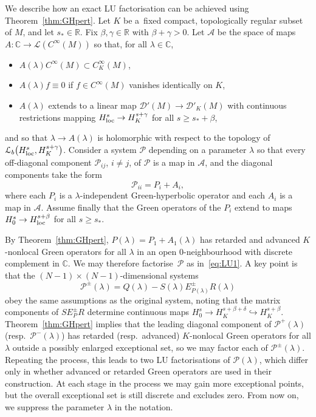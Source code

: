 \documentclass[pdftex]{sigma}
\numberwithin{equation}{section}
\newcommand{\CC}{{\mathbb C}}
\newcommand{\RR}{{\mathbb R}}
\newcommand{\DD}{{\mathscr D}}
\newcommand{\LL}{{\mathcal L}}
\newcommand{\loc}{{\rm loc}}
\newcommand{\Ps}{\mathcal{P}}
\begin{document}
 We describe how an exact LU factorisation can be achieved using Theorem~\ref{thm:GHpert}. Let $K$ be a~fixed compact, topologically regular subset of $M$, and let $s_*\in\RR$. Fix $\beta,\gamma\in\RR$ with $\beta+\gamma>0$. Let $\mathscr{A}$ be the space of maps $A\colon \CC\to \LL(C^\infty(M))$ so that, for all $\lambda\in\CC$,
 \begin{itemize}\itemsep=0pt
 	\item $A(\lambda)C^\infty(M)\subset C^\infty_K(M)$,
 	\item $A(\lambda)f\equiv 0$ if $f\in C^\infty(M)$ vanishes identically on $K$,
 	\item $A(\lambda)$ extends to a linear map $\DD'(M)\to\DD'_K(M)$ with continuous restrictions mapping $H^s_\loc\to H^{s+\gamma}_K$ for all $s\ge s_*+\beta$,
 \end{itemize}
 and so that $\lambda\to A(\lambda)$ is holomorphic with respect to the topology of $\LL_b\big(H^s_\loc,H_K^{s+\gamma}\big)$. Consider a system $\Ps$ depending on a parameter $\lambda$ so that
 every off-diagonal component $\Ps_{ij}$, $i\neq j$,
 of $\Ps$ is a map in $\mathscr{A}$, and the diagonal components take the form
 \begin{equation*}
 	\Ps_{ii} = P_i + A_i,
 \end{equation*}
 where each $P_i$ is a $\lambda$-independent Green-hyperbolic operator and each $A_i$ is a map in $\mathscr{A}$.
 Assume finally that the Green operators of the $P_i$ extend to maps $H^s_0\to H^{s+\beta}_\loc$ for all $s\ge s_*$.

 By Theorem~\ref{thm:GHpert}, $P(\lambda)=P_1+A_1(\lambda)$ has retarded and advanced $K$-nonlocal Green operators
 for all $\lambda$ in an open $0$-neighbourhood with discrete complement in $\CC$.
 We may therefore factorise~$\Ps$ as in~\eqref{eq:LU1}. A key point is that the $(N-1)\times (N-1)$-dimensional systems
 \begin{equation*}
 	\Ps^\pm(\lambda)= Q(\lambda)-S(\lambda)E_{P(\lambda)}^\pm R(\lambda)
 \end{equation*}
 obey the same assumptions as the original system, noting that the matrix components of $SE_P^\pm R$ determine continuous maps $H^s_0\to H_K^{s+\beta+\delta}\hookrightarrow H_K^{s+\beta}$. Theorem~\ref{thm:GHpert} implies that the leading diagonal component of $\Ps^+(\lambda)$ (resp.\ $\Ps^-(\lambda)$) has retarded (resp.\ advanced) $K$-nonlocal Green operators for all $\lambda$ outside a possibly enlarged exceptional set, so we may factor each of $\Ps^\pm(\lambda)$. Repeating the process, this leads to two LU factorisations of $\Ps(\lambda)$, which differ only in whether advanced or retarded Green operators are used in their construction. At each stage in the process we may gain more exceptional points, but the overall exceptional set is still discrete and excludes zero. From now on, we suppress the parameter $\lambda$ in the notation.
\end{document}
